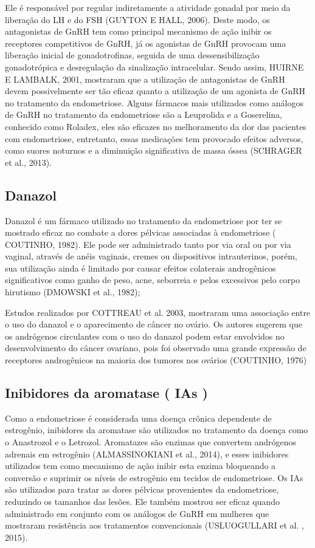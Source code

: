 \documentclass[12pt]{article} %
\begin{document}
Ele é responsável por regular indiretamente a atividade gonadal por
meio da liberação do LH e do FSH (GUYTON E HALL, 2006). Deste modo, os
antagonistas de GnRH tem como principal mecanismo de ação inibir os
receptores competitivos de GnRH, já os agonistas de GnRH provocam uma
liberação inicial de gonadotrofinas, seguida de uma dessensibilização
gonadotrópica e desregulação da sinalização intracelular. Sendo assim,
HUIRNE E LAMBALK, 2001, mostraram que a utilização de antagonistas de
GnRH devem possivelmente ser tão eficaz quanto a utilização de um
agonista de GnRH no tratamento da endometriose.  Alguns fármacos mais
utilizados como análogos de GnRH no tratamento da endometriose são a
Leuprolida e a Goserelina, conhecido como Roladex, eles são eficazes %
no melhoramento da dor das pacientes com endometriose, entretanto,
essas medicações tem provocado efeitos adversos, como suores noturnos
e a diminuição significativa de massa óssea (SCHRAGER et al., 2013).

\subsection{Danazol}

Danazol é um fármaco utilizado no tratamento da endometriose por ter
se mostrado eficaz no combate a dores pélvicas associadas à
endometriose ( COUTINHO, 1982). Ele pode ser administrado tanto por via oral ou por via
vaginal, através de anéis vaginais, cremes ou dispositivos
intrauterinos, porém, sua utilização ainda é limitado por causar
efeitos colaterais androgênicos significativos como ganho de peso,
acne, seborreia e pelos excessivos pelo corpo hirutismo (DMOWSKI et al., 1982);

Estudos realizados por COTTREAU et al. 2003, mostraram uma associação
entre o uso do danazol e o aparecimento de câncer no ovário. Os
autores sugerem que os andrógenos circulantes com o uso do danazol
podem estar envolvidos no desenvolvimento do câncer ovariano, pois foi
observado uma grande expressão de receptores androgênicos na maioria
dos tumores nos ovários (COUTINHO, 1976)

\subsection{Inibidores da aromatase ( IAs )}

Como a endometriose é considerada uma doença crônica dependente de
estrogênio, inibidores da aromatase são utilizados no tratamento da
doença como o Anastrozol e o Letrozol. Aromatazes são enzimas que
convertem andrógenos adrenais em estrogênio (ALMASSINOKIANI et al.,
2014), e esses inibidores utilizados tem como mecanismo de ação inibir
esta enzima bloqueando a conversão e suprimir os níveis de estrogênio
em tecidos de endometriose. Os IAs são utilizados para tratar as dores
pélvicas provenientes da endometriose, reduzindo os tamanhos das
lesões. Ele também mostrou ser eficaz quando administrado em conjunto
com os análogos de GnRH em mulheres que mostraram resistência aos
tratamentos convencionais (USLUOGULLARI et al. , 2015).
\end{document}
